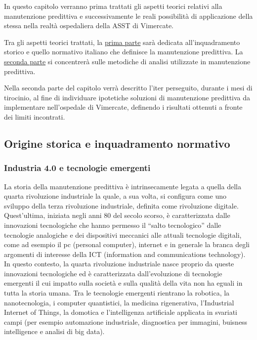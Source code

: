 \documentclass[10pt,]{article}
\begin{document}
In questo capitolo verranno prima trattati gli aspetti teorici relativi
alla manutenzione predittiva e successivamente le reali possibilità di
applicazione della stessa nella realtà ospedaliera della ASST di
Vimercate.

Tra gli aspetti teorici trattati, la
\protect\hyperlink{ux5cux23ux5cux2520Origineux5cux2520storicaux5cux2520eux5cux2520inquadramentoux5cux2520normativo}{prima
parte} sarà dedicata all'inquadramento storico e quello normativo
italiano che definisce la manutenzione predittiva. La
\protect\hyperlink{ux5cux23ux5cux2520Metodiux5cux2520analiticiux5cux2520diux5cux2520predizione}{seconda
parte} si concentrerà sulle metodiche di analisi utilizzate in
manutenzione predittiva.

Nella seconda parte del capitolo verrà descritto l'iter perseguito,
durante i mesi di tirocinio, al fine di individuare ipotetiche soluzioni
di manutenzione predittiva da implementare nell'ospedale di Vimercate,
definendo i risultati ottenuti a fronte dei limiti incontrati.

\subsection{Origine storica e inquadramento
normativo}\label{origine-storica-e-inquadramento-normativo}

\subsubsection{Industria 4.0 e tecnologie
emergenti}\label{industria-4.0-e-tecnologie-emergenti}

La storia della manutenzione predittiva è intrinsecamente legata a
quella della quarta rivoluzione industriale la quale, a sua volta, si
configura come uno sviluppo della terza rivoluzione industriale,
definita come rivoluzione digitale. Quest'ultima, iniziata negli anni 80
del secolo scorso, è caratterizzata dalle innovazioni tecnologiche che
hanno permesso il ``salto tecnologico'' dalle tecnologie analogiche e
dei dispositivi meccanici alle attuali tecnologie digitali, come ad
esempio il pc (personal computer), internet e in generale la branca
degli argomenti di interesse della ICT (information and communications
technology). In questo contesto, la quarta rivoluzione industriale nasce
proprio da queste innovazioni tecnologiche ed è caratterizzata
dall'evoluzione di tecnologie emergenti il cui impatto sulla società e
sulla qualità della vita non ha eguali in tutta la storia umana. Tra le
tecnologie emergenti rientrano la robotica, la nanotecnologia, i
computer quantistici, la medicina rigenerativa, l'Industrial Internet of
Things, la domotica e l'intelligenza artificiale applicata in svariati
campi (per esempio automazione industriale, diagnostica per immagini,
buisness intelligence e analisi di big data).
\end{document}
